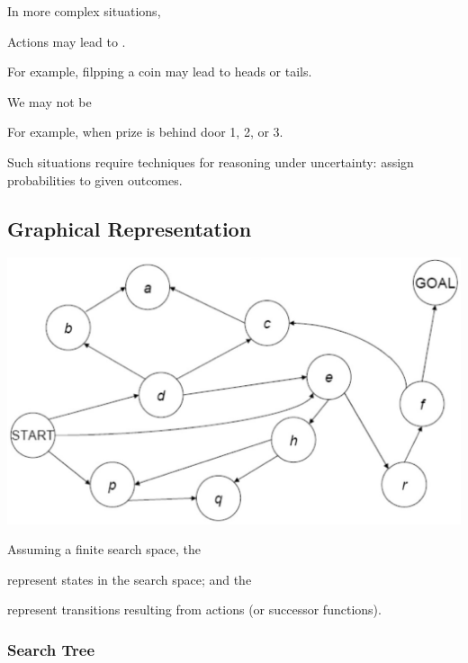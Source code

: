 
In more complex situations,

\begin{listu}
    \item Actions may lead to .

    For example, filpping a coin may lead to heads or tails.

    \item We may not be 

    For example, when prize is behind door 1, 2, or 3.

    \item Such situations require techniques for reasoning under uncertainty: assign probabilities to given outcomes.
\end{listu}

\subsection{Graphical Representation}

\begin{center}
    \includegraphics[width=0.5\linewidth]{figures/Search Graph Rep.png}
\end{center}

Assuming a finite search space, the

\begin{listu}
    \item {} represent states in the search space; and the
    \item {} represent transitions resulting from actions (or successor functions).
\end{listu}

\subsubsection{Search Tree}


